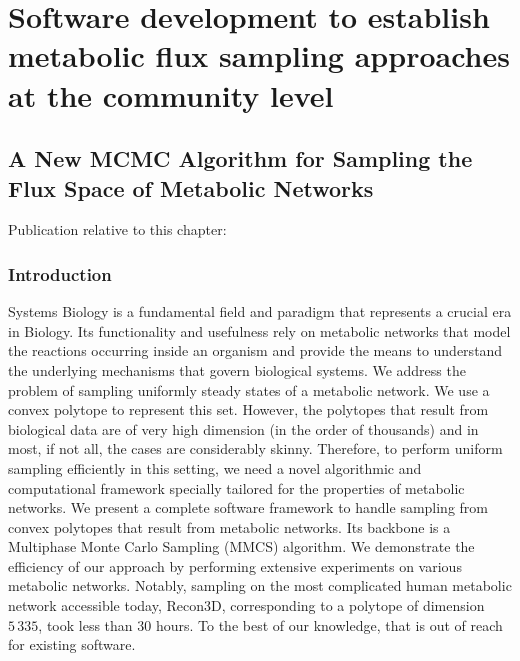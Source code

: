 % 
% 

\chapter{Software development to establish metabolic flux sampling 
         approaches at the community level}
\label{cha:dingo}





\section{A New MCMC Algorithm for Sampling the Flux Space of
Metabolic Networks}

   Publication relative to this chapter: \cite{chalki2021SoCG}

\subsection{Introduction}


   Systems Biology is a fundamental field and paradigm that represents a crucial era in Biology. 
   Its functionality and usefulness rely on metabolic networks that model the reactions occurring inside an organism and provide the means to understand the underlying mechanisms that govern biological systems. 
   We address the problem of sampling uniformly steady states of a metabolic network. 
   We use a convex polytope to represent this set. 
   However, the polytopes that result from biological data are of very high dimension (in the order of thousands) and in most, if not all, the cases are considerably skinny. 
   Therefore, to perform uniform sampling efficiently in this setting, we need a novel algorithmic and computational framework specially tailored for the properties of metabolic networks. 
   We present a complete software framework to handle sampling from convex polytopes that result from metabolic networks. 
   Its backbone is a Multiphase Monte Carlo Sampling (MMCS) algorithm.
   We demonstrate the efficiency of our approach by performing extensive experiments on various metabolic networks. 
   Notably, sampling on the most complicated human metabolic network accessible today, Recon3D, corresponding to a polytope of dimension $5\,335$, took less than $30$ hours. 
   To the best of our knowledge, that is out of reach for existing software.

